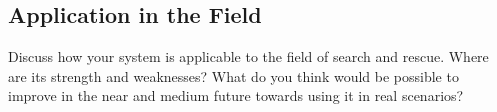 \subsection{Application in the Field}
Discuss how your system is applicable to the field of search and rescue. Where are its strength and weaknesses? What do you think would be possible to improve in the near and medium future towards using it in real scenarios?
